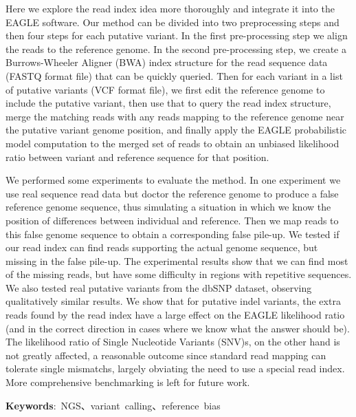 Here we explore the read index idea more thoroughly and integrate it into the EAGLE software.
Our method can be divided into two preprocessing steps and then four steps for each putative variant.  In the first pre-processing step we align the reads to the reference genome.  In the second pre-processing step, we create a Burrows-Wheeler Aligner (BWA) index structure for the read sequence data (FASTQ format file) that can be quickly queried.  Then for each variant in a list of putative variants (VCF format file), we first edit the reference genome to include the putative variant, then use that to query the read index structure, merge the matching reads with any reads mapping to the reference genome near the putative variant genome position, and finally apply the EAGLE probabilistic model computation to the merged set of reads to obtain an unbiased likelihood ratio between variant and reference sequence for that position.

We performed some experiments to evaluate the method.  In one experiment we use real sequence read data but doctor the reference genome to produce a false reference genome sequence, thus simulating a situation in which we know the position of differences between individual and reference.  Then we map reads to this false genome sequence to obtain a corresponding false pile-up.   We tested if our read index can find reads supporting the actual genome sequence, but missing in the false pile-up.  The experimental results show that we can find most of the missing reads, but have some difficulty in regions with repetitive sequences.  We also tested real putative variants from the dbSNP dataset, observing qualitatively similar results.  We show that for putative indel variants, the extra reads found by the read index have a large effect on the EAGLE likelihood ratio (and in the correct direction in cases where we know what the answer should be).  The likelihood ratio of Single Nucleotide Variants (SNV)s, on the other hand is not greatly affected, a reasonable outcome since standard read mapping can tolerate single mismatchs, largely obviating the need to use a special read index.  More comprehensive benchmarking is left for future work.


\begin{flushleft}
\mbox{{\bf Keywords}:  NGS、variant calling、reference bias }
\end{flushleft}
